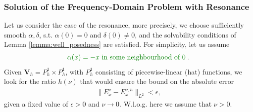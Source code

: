 \subsubsection{Solution of the Frequency-Domain Problem with Resonance}
Let us consider the case of the resonance, more precisely, we choose sufficiently smooth
$\alpha,\delta$, s.t. $\alpha(0)=0$ and $\delta(0)\neq 0$, and the solvability conditions 
of Lemma \ref{lemma:well_posedness}  are satisfied. 
For simplicity, let us assume 
\begin{align}
\label{eq:cond}
 \mrev{\alpha(x)=-x \text{  in some neighbourhood of $0$ }}.
\end{align}
Given $\mathbf{V}_{h}=P_{h}^{1}\times P_{h}^{1}$, with $P_{h}^{1}$ consisting of piecewise-linear (hat) functions, 
we look for the ratio $h(\nu)$ that would ensure the bound on the absolute error 
\begin{align}
\label{eq:problem1}
\|E^{\nu}_{x}-E^{\nu,h}_{x}\|_{L^2}<\epsilon,
\end{align}
given a fixed value of $\epsilon>0$ and $\nu\rightarrow 0$. W.l.o.g. here we assume that $\nu>0$. 

